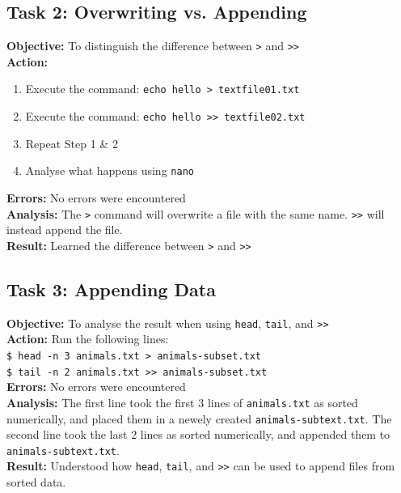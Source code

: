 \documentclass{article}
\begin{document}
\subsection{Task 2: Overwriting vs. Appending}
%
\textbf{Objective:} To distinguish the difference between \verb|>| and \verb|>>|\\
\textbf{Action:}
\begin{enumerate}
    \item Execute the command: \verb|echo hello > textfile01.txt|
    \item Execute the command: \verb|echo hello >> textfile02.txt|
    \item Repeat Step 1 \& 2
    \item Analyse what happens using \texttt{nano}
\end{enumerate}
\textbf{Errors:} No errors were encountered\\
\textbf{Analysis:} The \verb|>| command will overwrite a file with the same name. \verb|>>| will instead append the file.\\
\textbf{Result:} Learned the difference between \verb|>| and \verb|>>|
%
\subsection{Task 3: Appending Data}
%
\textbf{Objective:} To analyse the result when using \texttt{head}, \texttt{tail}, and \verb|>>|\\
\textbf{Action:} Run the following lines:\\
\verb|$ head -n 3 animals.txt > animals-subset.txt|\\
\verb|$ tail -n 2 animals.txt >> animals-subset.txt|\\
\textbf{Errors:} No errors were encountered\\
\textbf{Analysis:} The first line took the first 3 lines of \texttt{animals.txt} as sorted numerically, and placed them in a newely created \texttt{animals-subtext.txt}. The second line took the last 2 lines as sorted numerically, and appended them to \texttt{animals-subtext.txt}.\\
\textbf{Result:} Understood how \texttt{head}, \texttt{tail}, and \verb|>>| can be used to append files from sorted data.
%
\end{document}

